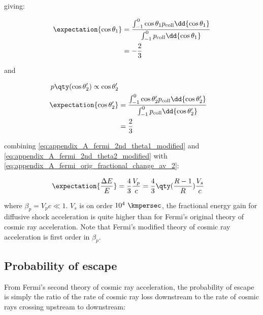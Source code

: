 giving:

\begin{equation}
    \begin{aligned}
    \expectation{\cos\theta_1}&=\frac{\int_{-1}^{0}\cos\theta_1p_\text{coll}\dd{\cos\theta_1}}{\int_{-1}^{0}p_\text{coll}\dd{\cos\theta_1}} \\
&=-\frac{2}{3}
    \end{aligned} \label{eq:appendix_A_fermi_2nd_theta1_modified}
\end{equation}

and

\begin{equation}
    \begin{aligned}
    p\qty(\cos\theta_2')\propto\cos\theta_2' \\
\expectation{\cos\theta_2'}&=\frac{\int_{-1}^{0}\cos\theta_2'p_\text{coll}\dd{\cos\theta_2'}}{\int_{-1}^{0}p_\text{coll}\dd{\cos\theta_2'}} \\
&=\frac{2}{3}
    \end{aligned} \label{eq:appendix_A_fermi_2nd_theta2_modified}
\end{equation}

combining \autoref{eq:appendix_A_fermi_2nd_theta1_modified} and \autoref{eq:appendix_A_fermi_2nd_theta2_modified} with \autoref{eq:appendix_A_fermi_orig_fractional_change_av_2}:

\begin{equation}
    \begin{aligned}
    \expectation{\frac{\Delta E}{E}}&=\frac{4}{3}\frac{V_p}{c}=\frac{4}{3}\qty(\frac{R-1}{R})\frac{V_s}{c}
    \end{aligned} \label{eq:appendix_A_fermi_2nd_fractional_change}
\end{equation}

where $\beta_p=V_p c\ll 1$. $V_s$ is on order $10^4~\kmpersec$, the fractional energy gain for diffusive shock acceleration is quite higher than for Fermi's original theory of cosmic ray acceleration. Note that Fermi's modified theory of cosmic ray acceleration is first order in $\beta_p$.

\subsection{Probability of escape}

From Fermi's second theory of cosmic ray acceleration, the probability of escape is simply the ratio of the rate of cosmic ray loss downstream to the rate of cosmic rays crossing upstream to downstream:

